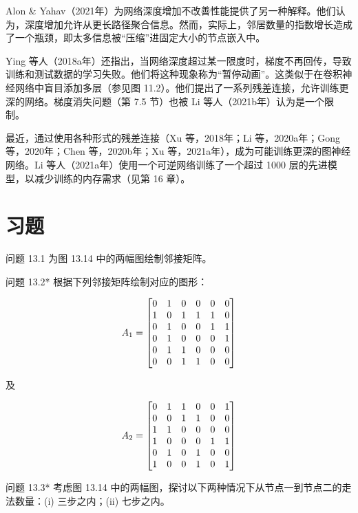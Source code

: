 \documentclass[lang=cn,newtx,10pt,scheme=chinese]{elegantbook}
\begin{document}
Alon \& Yahav（2021年）为网络深度增加不改善性能提供了另一种解释。他们认为，深度增加允许从更长路径聚合信息。然而，实际上，邻居数量的指数增长造成了一个瓶颈，即太多信息被“压缩”进固定大小的节点嵌入中。

Ying 等人（2018a年）还指出，当网络深度超过某一限度时，梯度不再回传，导致训练和测试数据的学习失败。他们将这种现象称为“暂停动画”。这类似于在卷积神经网络中盲目添加多层（参见图 11.2）。他们提出了一系列残差连接，允许训练更深的网络。梯度消失问题（第 7.5 节）也被 Li 等人（2021b年）认为是一个限制。

最近，通过使用各种形式的残差连接（Xu 等，2018年；Li 等，2020a年；Gong 等，2020年；Chen 等，2020b年；Xu 等，2021a年），成为可能训练更深的图神经网络。Li 等人（2021a年）使用一个可逆网络训练了一个超过 1000 层的先进模型，以减少训练的内存需求（见第 16 章）。

\section{习题}
问题 13.1 为图 13.14 中的两幅图绘制邻接矩阵。

问题 13.2* 根据下列邻接矩阵绘制对应的图形：

\begin{equation}
A_1 =
\begin{bmatrix}
0 & 1 & 0 & 0 & 0 & 0 \\
1 & 0 & 1 & 1 & 1 & 0 \\
0 & 1 & 0 & 0 & 1 & 1 \\
0 & 1 & 0 & 0 & 0 & 1 \\
0 & 1 & 1 & 0 & 0 & 0 \\
0 & 0 & 1 & 1 & 0 & 0  \notag \\
\end{bmatrix}
\end{equation}

及

\begin{equation}
A_2 =
\begin{bmatrix}
0 & 1 & 1 & 0 & 0 & 1 \\
0 & 0 & 1 & 1 & 0 & 0 \\
1 & 1 & 0 & 0 & 0 & 0 \\
1 & 0 & 0 & 0 & 1 & 1 \\
0 & 1 & 0 & 1 & 0 & 0 \\
1 & 0 & 0 & 1 & 0 & 1 \notag \\
\end{bmatrix}
\end{equation}

问题 13.3* 考虑图 13.14 中的两幅图，探讨以下两种情况下从节点一到节点二的走法数量：(i) 三步之内；(ii) 七步之内。
\end{document}

